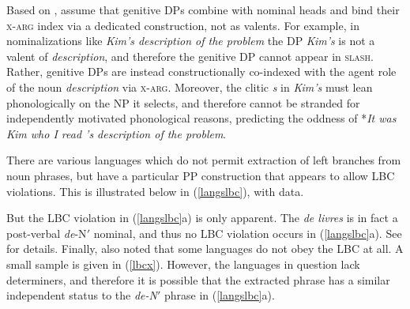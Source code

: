 \documentclass[output=paper,biblatex,babelshorthands,newtxmath,draftmode,colorlinks,citecolor=brown]{langscibook}
\begin{document}
\noindent
Based on \citet[133]{cxsag07}, \citet[197, 198]{CP2020a-u} assume that genitive DPs combine
with nominal heads and bind their \textsc{x-arg} index via a dedicated construction, not as valents.
For example, in nominalizations like \emph{Kim's description of the problem} the DP \emph{Kim's} is
not a valent of \emph{description}, and therefore the genitive DP cannot appear in \textsc{slash}.
Rather, genitive DPs are instead constructionally co-indexed with the agent role of the noun
\emph{description} via \textsc{x-arg}.  Moreover, the clitic \emph{s} in \emph{Kim's} must lean
phonologically on the NP it selects, and therefore cannot be stranded for independently motivated
phonological reasons, predicting the oddness of *\emph{It was Kim who I read 's description of the
  problem}.

There are various languages which do not permit extraction of left branches from noun phrases, but
have a particular PP construction that appears to allow LBC violations.  This is illustrated below
in (\ref{langslbc}), with  data.

\eal \label{langslbc}

 \zl 


\noindent
But the LBC violation in (\ref{langslbc}a) is only apparent. The {\it de livres} is in fact a
post-verbal {\it de}-N$'$ nominal, and thus no LBC violation occurs in (\ref{langslbc}a). See
\citet{Abeille:Bonami:ea:04} for details.  Finally, \citet[236--237]{Ross67} also noted that some languages do
not obey the LBC at all. A small sample is given in (\ref{lbcx}). However, the languages in question
lack determiners, and therefore it is possible that the extracted phrase has a similar
independent status to the  {\it de-N}$'$ phrase in (\ref{langslbc}a).
 
\end{document}
